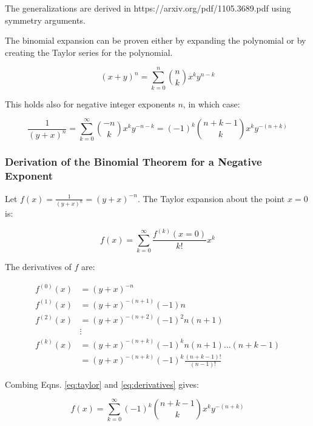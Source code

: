 The generalizations are derived in https://arxiv.org/pdf/1105.3689.pdf using symmetry arguments.


The binomial expansion can be proven either by expanding the polynomial or by creating the Taylor series for the polynomial.

\begin{equation}
(x + y)^n = \sum_{k=0}^n {n \choose k} x^k y^{n-k}
\end{equation}

This holds also for negative integer exponents $n$, in which case:

\begin{equation}
\frac{1}{(y+x)^n} = \sum_{k=0}^\infty {-n \choose k} x^k y^{-n-k} = (-1)^k { n+k-1 \choose k} x^k y^{-(n+k)}
\end{equation}

\subsubsection{Derivation of the Binomial Theorem for a Negative Exponent}

Let $f(x) = \frac{1}{(y+x)^n} = (y+x)^{-n}$. The Taylor expansion about the point $x=0$ is:

\begin{equation}
f(x) = \sum_{k=0}^\infty \frac{f^{(k)}(x=0)}{k!} x^k
\label{eq:taylor}
\end{equation}

The derivatives of $f$ are:

\begin{equation}
\begin{array}{ll}
f^{(0)}(x) &= (y+x)^{-n}\\
f^{(1)}(x) &= (y+x)^{-(n+1)}(-1)n\\
f^{(2)}(x) &= (y+x)^{-(n+2)}(-1)^2 n(n+1)\\
&\vdots\\
f^{(k)}(x) &= (y+x)^{-(n+k)}(-1)^k n(n+1)\hdots	(n+k-1)\\
&=  (y+x)^{-(n+k)}(-1)^k \frac{(n+k-1)!}{(n-1)!}
\end{array}
\label{eq:derivatives}
\end{equation} 

Combing Eqns. \ref{eq:taylor} and \ref{eq:derivatives} gives:

\begin{equation}
f(x) = \sum_{k=0}^\infty (-1)^k {n+k-1 \choose k} x^k y^{-(n+k)}
\end{equation}


